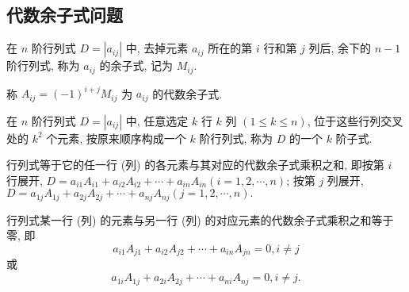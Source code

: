 \subsection{代数余子式问题}

\begin{definition}
    在 $ n $ 阶行列式 $ D=\left|a_{i j}\right| $ 中, 去掉元素 $ a_{i j} $ 所在的第 $ i $ 行和第 $ j $ 列后, 余下的 $ n-1 $ 阶行列式, 称为 $ a_{i j} $ 的余子式, 记为 $ M_{i j} .$
\end{definition}
\begin{definition}
    称 $ A_{i j}=(-1)^{i+j} M_{i j} $ 为 $ a_{i j} $ 的代数余子式.
\end{definition}
\begin{definition}
    在 $ n $ 阶行列式 $ D=\left|a_{i j}\right| $ 中, 任意选定 $ k $ 行 $ k $ 列 $ (1 \leqslant k \leqslant n) $, 
    位于这些行列交叉处的 $ k^{2} $ 个元素, 按原来顺序构成一个 $ k $ 阶行列式, 称为 $ D $ 的一个 $ k $ 阶子式.
\end{definition}
\begin{theorem}
    行列式等于它的任一行 (列) 的各元素与其对应的代数余子式乘积之和, 即按第 $ i $ 行展开, $D=a_{i 1} A_{i 1}+a_{i 2} A_{i 2}+\cdots+a_{i n} A_{i n}(i=1,2, \cdots, n) $;
    按第 $ j $ 列展开, $D=a_{1 j} A_{1 j}+a_{2 j} A_{2 j}+\cdots+a_{n j} A_{n j}(j=1,2, \cdots, n) .$
\end{theorem}
\begin{theorem}
    行列式某一行 (列) 的元素与另一行 (列) 的对应元素的代数余子式乘积之和等于零, 即
    $$a_{i 1} A_{j 1}+a_{i 2} A_{j 2}+\cdots+a_{i n} A_{j n}=0, i \neq j$$
    或
    $$a_{1 i} A_{1 j}+a_{2 i} A_{2 j}+\cdots+a_{n i} A_{n j}=0, i \neq j .$$
\end{theorem}

